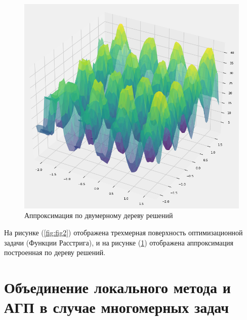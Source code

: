 \documentclass[12pt, a4paper, russian]{article}
\begin{document}
\begin{figure}[ht!]
	\begin{center}
			\begin{minipage}[h]{0.8\linewidth}
					\includegraphics[width=1\linewidth]{figure/Figure_2}
					\caption{Аппроксимация по двумерному дереву решений} %
					\label{fig:fig2_2}
				\end{minipage}
		\end{center}
\end{figure}	

На рисунке  (\ref{fig:fig2}) отображена трехмерная поверхность  оптимизационной задачи (Функции Расстрига), и на рисунке  (\ref{fig:fig2_2}) отображена аппроксимация   построенная по дереву решений. 

\section{Объединение локального метода и АГП в случае многомерных задач}
\end{document}
